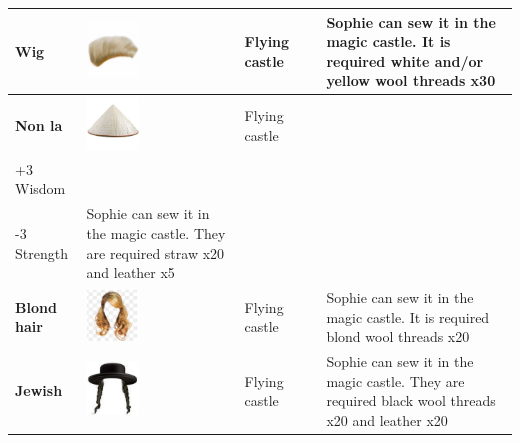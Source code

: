\begin{longtable}[H]{|p{2cm}|p{1.5cm}|p{2cm}|p{2.8cm}|p{6.3cm}|}
\textbf{Wig}                         & \includegraphics[width=1.4cm]{Images/Hats/wig}                & Flying castle                                                  &                                                                                       & Sophie can sew it in the magic castle. It is required white and/or yellow wool threads x30                                             \\ \hline
\textbf{Non la}                      & \includegraphics[width=1.4cm]{Images/Hats/nonLa}              & Flying castle                                                  & \begin{tabular}[c]{@{}l@{}}+3 Intelligence\\ +3 Wisdom\\ -3 Strength\end{tabular}     & Sophie can sew it in the magic castle. They are required straw x20 and leather x5                                                      \\ \hline
\textbf{Blond hair}                  & \includegraphics[width=1.4cm]{Images/Hats/blondHair}          & Flying castle                                                  &                                                                                       & Sophie can sew it in the magic castle. It is required blond wool threads x20                                                           \\ \hline
\textbf{Jewish}                      & \includegraphics[width=1.4cm]{Images/Hats/jewish}             & Flying castle                                                  &                                                                                       & Sophie can sew it in the magic castle. They are required black wool threads x20 and leather x20                                        \\ \hline

\end{longtable}
